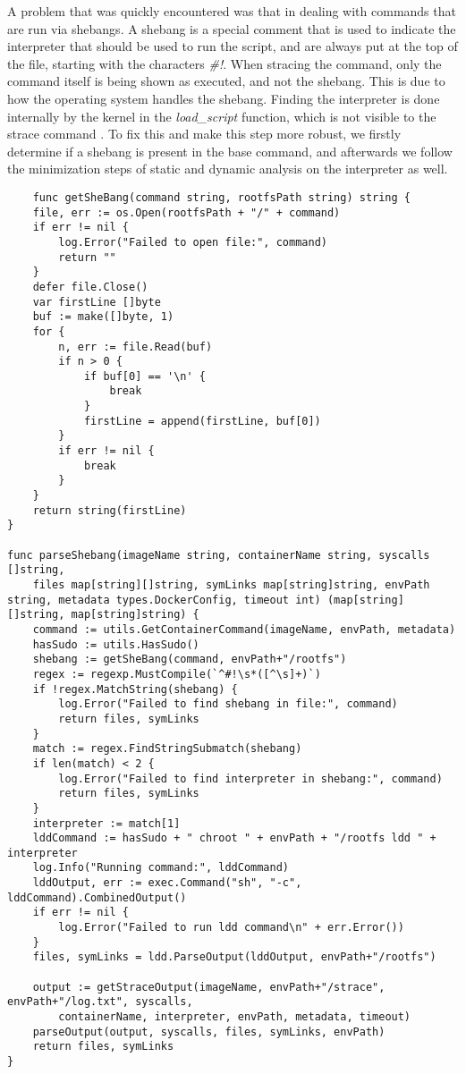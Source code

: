 A problem that was quickly encountered was that in dealing with commands that are run via shebangs.
A shebang is a special comment that is used to indicate the interpreter that should be used to run the script, and are always 
put at the top of the file, starting with the characters \textit{\#!}.
When stracing the command, only the command itself is being shown as executed, and not the shebang. This is due 
to how the operating system handles the shebang. Finding the interpreter is done internally by the kernel in the
\textit{load_script} function, which is not visible to the strace command \cite{demystifying-shebang}. 
To fix this and make this step more robust, we firstly determine if a shebang is present in the base command, and afterwards 
we follow the minimization steps of static and dynamic analysis on the interpreter as well.

\lstset{language=Go,caption=File util functions,label=lst:file-functions}
\begin{lstlisting}
    func getSheBang(command string, rootfsPath string) string {
	file, err := os.Open(rootfsPath + "/" + command)
	if err != nil {
		log.Error("Failed to open file:", command)
		return ""
	}
	defer file.Close()
	var firstLine []byte
	buf := make([]byte, 1)
	for {
		n, err := file.Read(buf)
		if n > 0 {
			if buf[0] == '\n' {
				break
			}
			firstLine = append(firstLine, buf[0])
		}
		if err != nil {
			break
		}
	}
	return string(firstLine)
}

func parseShebang(imageName string, containerName string, syscalls []string,
	files map[string][]string, symLinks map[string]string, envPath string, metadata types.DockerConfig, timeout int) (map[string][]string, map[string]string) {
	command := utils.GetContainerCommand(imageName, envPath, metadata)
	hasSudo := utils.HasSudo()
	shebang := getSheBang(command, envPath+"/rootfs")
	regex := regexp.MustCompile(`^#!\s*([^\s]+)`)
	if !regex.MatchString(shebang) {
		log.Error("Failed to find shebang in file:", command)
		return files, symLinks
	}
	match := regex.FindStringSubmatch(shebang)
	if len(match) < 2 {
		log.Error("Failed to find interpreter in shebang:", command)
		return files, symLinks
	}
	interpreter := match[1]
	lddCommand := hasSudo + " chroot " + envPath + "/rootfs ldd " + interpreter
	log.Info("Running command:", lddCommand)
	lddOutput, err := exec.Command("sh", "-c", lddCommand).CombinedOutput()
	if err != nil {
		log.Error("Failed to run ldd command\n" + err.Error())
	}
	files, symLinks = ldd.ParseOutput(lddOutput, envPath+"/rootfs")

	output := getStraceOutput(imageName, envPath+"/strace", envPath+"/log.txt", syscalls,
		containerName, interpreter, envPath, metadata, timeout)
	parseOutput(output, syscalls, files, symLinks, envPath)
	return files, symLinks
}
\end{lstlisting}

